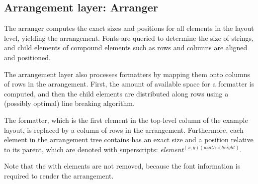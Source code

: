 %																
\subsection{Arrangement layer: Arranger} \label{sect:arranger}

The arranger computes the exact sizes and positions for all elements in the layout level, yielding the arrangement. Fonts are queried to determine the size of strings, and child elements of compound elements such as rows and columns are aligned and positioned.

The arrangement layer also processes formatters by mapping them onto columns of rows in the arrangement. First, the amount of available space for a formatter is computed, and then the child elements are distributed along rows using a (possibly optimal) line breaking algorithm.


 The formatter, which is the first element in the top-level column of the example layout, is replaced by a column of rows in the arrangement. Furthermore, each element in the arrangement tree contains has an exact size and a position relative to its parent, which are denoted with superscripts: {\em element}$^{(x,y)(width\times height)}$. 

Note that the with elements are not removed, because the font information is required to render the arrangement.

